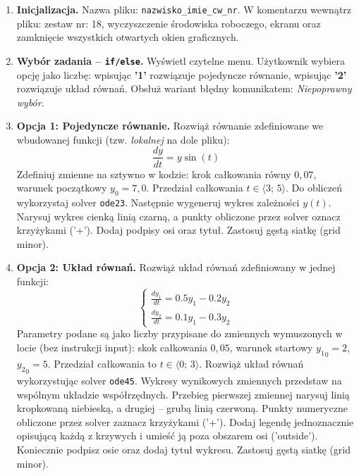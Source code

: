 \documentclass[a4paper,11pt]{article}
\begin{document}
\begin{enumerate}[leftmargin=*, label=\textbf{\arabic*.}, itemsep=2pt]

  \item \textbf{Inicjalizacja.}
    Nazwa pliku: \texttt{nazwisko\_imie\_cw\_nr}. W komentarzu wewnątrz pliku: zestaw nr: 18, wyczyszczenie środowiska roboczego, ekranu oraz zamknięcie wszystkich otwartych okien graficznych.

  \item \textbf{Wybór zadania -- \texttt{if/else}.}
    Wyświetl czytelne menu. Użytkownik wybiera opcję jako liczbę: wpisując \textbf{'1'} rozwiązuje pojedyncze równanie, wpisując \textbf{'2'} rozwiązuje układ równań. Obsłuż wariant błędny komunikatem: \textit{Niepoprawny wybór}.

  \item \textbf{Opcja 1: Pojedyncze równanie.}
    Rozwiąż równanie zdefiniowane we wbudowanej funkcji (tzw. \textit{lokalnej} na dole pliku):
    \[ \frac{dy}{dt} = y\sin(t) \]
    Zdefiniuj zmienne na sztywno w kodzie: krok całkowania równy $0{,}07$, warunek początkowy $y_0 = 7{,}0$. Przedział całkowania $t \in \langle 3;\,5 \rangle$.
    Do obliczeń wykorzystaj solver \texttt{ode23}. Następnie wygeneruj wykres zależności $y(t)$. Narysuj wykres cienką linią czarną, a punkty obliczone przez solver oznacz krzyżykami ('+'). Dodaj podpisy osi oraz tytuł. Zastosuj gęstą siatkę (grid minor).

  \item \textbf{Opcja 2: Układ równań.}
    Rozwiąż układ równań zdefiniowany w jednej funkcji:\\[-0.5em]
    \[
    \begin{cases}
      \frac{dy_1}{dt} = 0.5y_1 - 0.2y_2 \\
      \frac{dy_2}{dt} = 0.1y_1 - 0.3y_2
    \end{cases}
    \]
    Parametry podane są jako liczby przypisane do zmiennych wymuszonych w locie (bez instrukcji input): skok całkowania $0{,}05$, warunek startowy $ {y_1}_{0} = 2 $, $ {y_2}_{0} = 5 $. Przedział całkowania to $t \in \langle 0;\,3 \rangle$.
    Rozwiąż układ równań wykorzystując solver \texttt{ode45}. Wykresy wynikowych zmiennych przedstaw na wspólnym układzie współrzędnych. Przebieg pierwszej zmiennej narysuj linią kropkowaną niebieską, a drugiej -- grubą linią czerwoną. Punkty numeryczne obliczone przez solver zaznacz krzyżykami ('+'). Dodaj legendę jednoznacznie opisującą każdą z krzywych i umieść ją poza obszarem osi ('outside'). Koniecznie podpisz osie oraz dodaj tytuł wykresu. Zastosuj gęstą siatkę (grid minor).

\end{enumerate}
\end{document}
